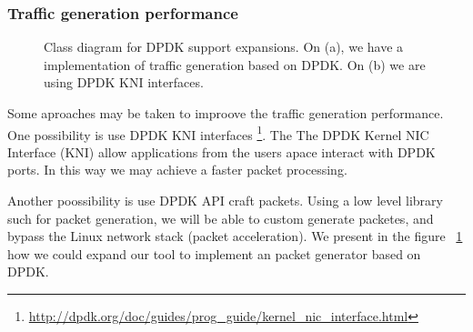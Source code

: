\subsubsection{Traffic generation performance}


\begin{figure}[h!]
	\centering
	\hspace{0mm}
	\caption{Class diagram for DPDK support expansions. On (a), we have a implementation of traffic generation based on DPDK. On (b) we are using DPDK KNI interfaces.}
	\label{fig:DpdkFlow}
\end{figure}

Some aproaches may be taken to improove the traffic generation performance. One possibility is use DPDK KNI interfaces \footnote{\href{http://dpdk.org/doc/guides/prog_guide/kernel_nic_interface.html}{http://dpdk.org/doc/guides/prog\_guide/kernel\_nic\_interface.html}}. The The DPDK Kernel NIC Interface (KNI) allow applications from the users apace interact with DPDK ports. In this way we may achieve a faster packet processing. 


Another poossibility is use DPDK API craft packets. Using a low level library such for packet generation, we will be able to custom generate packetes, and bypass the Linux network stack (packet acceleration). We present in the figure ~\ref{fig:DpdkFlow} how we could expand our tool to implement an packet generator based on DPDK.

